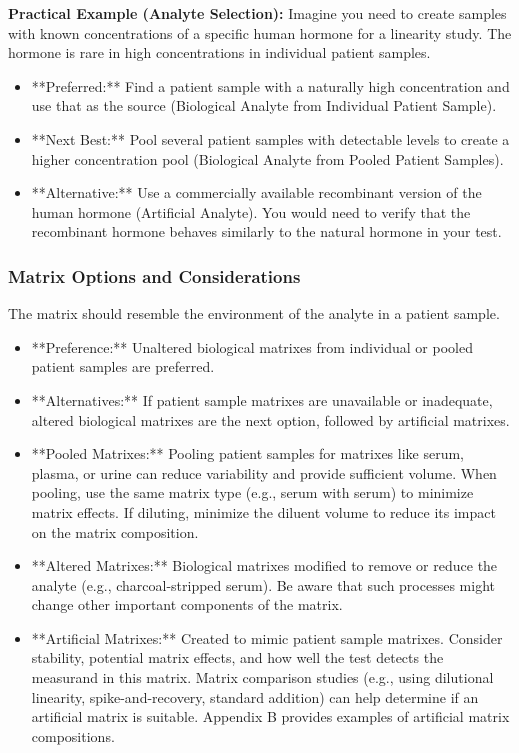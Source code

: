 \documentclass{article}
\begin{document}
\textbf{Practical Example (Analyte Selection):}
Imagine you need to create samples with known concentrations of a specific human hormone for a linearity study. The hormone is rare in high concentrations in individual patient samples.
\begin{itemize}
    \item **Preferred:** Find a patient sample with a naturally high concentration and use that as the source (Biological Analyte from Individual Patient Sample).
    \item **Next Best:** Pool several patient samples with detectable levels to create a higher concentration pool (Biological Analyte from Pooled Patient Samples).
    \item **Alternative:** Use a commercially available recombinant version of the human hormone (Artificial Analyte). You would need to verify that the recombinant hormone behaves similarly to the natural hormone in your test.
\end{itemize}

\subsubsection{Matrix Options and Considerations}

The matrix should resemble the environment of the analyte in a patient sample.
\begin{itemize}
    \item **Preference:** Unaltered biological matrixes from individual or pooled patient samples are preferred.
    \item **Alternatives:** If patient sample matrixes are unavailable or inadequate, altered biological matrixes are the next option, followed by artificial matrixes.
    \item **Pooled Matrixes:** Pooling patient samples for matrixes like serum, plasma, or urine can reduce variability and provide sufficient volume. When pooling, use the same matrix type (e.g., serum with serum) to minimize matrix effects. If diluting, minimize the diluent volume to reduce its impact on the matrix composition.
    \item **Altered Matrixes:** Biological matrixes modified to remove or reduce the analyte (e.g., charcoal-stripped serum). Be aware that such processes might change other important components of the matrix.
    \item **Artificial Matrixes:** Created to mimic patient sample matrixes. Consider stability, potential matrix effects, and how well the test detects the measurand in this matrix. Matrix comparison studies (e.g., using dilutional linearity, spike-and-recovery, standard addition) can help determine if an artificial matrix is suitable. Appendix B provides examples of artificial matrix compositions.
\end{itemize}
\end{document}
